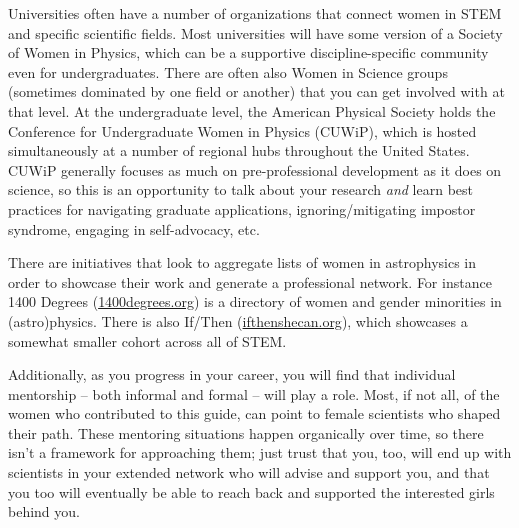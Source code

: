 Universities often have a number of organizations that connect women in STEM and specific scientific fields. Most universities will have some version of a Society of Women in Physics, which can be a supportive discipline-specific community even for undergraduates. There are often also Women in Science groups (sometimes dominated by one field or another) that you can get involved with at that level. At the undergraduate level, the American Physical Society holds the Conference for Undergraduate Women in Physics (CUWiP), which is hosted simultaneously at a number of regional hubs throughout the United States. CUWiP generally focuses as much on pre-professional development as it does on science, so this is an opportunity to talk about your research \textit{and} learn best practices for navigating graduate applications, ignoring/mitigating impostor syndrome, engaging in self-advocacy, etc.

There are initiatives that look to aggregate lists of women in astrophysics in order to showcase their work and generate a professional network. For instance 1400 Degrees (\href{https://1400degrees.org}{1400degrees.org}) is a directory of women and gender minorities in (astro)physics. There is also If/Then (\href{https://www.ifthenshecan.org}{ifthenshecan.org}), which showcases a somewhat smaller cohort across all of STEM.

Additionally, as you progress in your career, you will find that individual mentorship -- both informal and formal -- will play a role. Most, if not all, of the women who contributed to this guide, can point to female scientists who shaped their path. These mentoring situations happen organically over time, so there isn't a framework for approaching them; just trust that you, too, will end up with scientists in your extended network who will advise and support you, and that you too will eventually be able to reach back and supported the interested girls behind you.